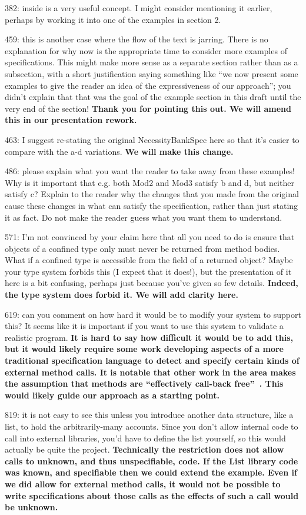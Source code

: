 \documentclass[11pt]{amsart}
\newcommand{\us}[1]{\bf #1}
\begin{document}
382: inside is a very useful concept. I might consider mentioning it earlier, perhaps by working it into one of the examples in section 2.

459: this is another case where the flow of the text is jarring. There is no explanation for why now is the appropriate time to consider more examples of specifications. This might make more sense as a separate section rather than as a subsection, with a short justification saying something like “we now present some examples to give the reader an idea of the expressiveness of our approach”; you didn’t explain that that was the goal of the example section in this draft until the very end of the section!
{\us{Thank you for pointing this out. We will amend this in our presentation rework.}}

463: I suggest re-stating the original NecessityBankSpec here so that it’s easier to compare with the a-d variations.
{\us{We will make this change.}}

486: please explain what you want the reader to take away from these examples! Why is it important that e.g. both Mod2 and Mod3 satisfy b and d, but neither satisfy c? Explain to the reader why the changes that you made from the original cause these changes in what can satisfy the specification, rather than just stating it as fact. Do not make the reader guess what you want them to understand.

571: I’m not convinced by your claim here that all you need to do is ensure that objects of a confined type only must never be returned from method bodies. What if a confined type is accessible from the field of a returned object? Maybe your type system forbids this (I expect that it does!), but the presentation of it here is a bit confusing, perhaps just because you’ve given so few details.
{\us{Indeed, the type system does forbid it. We will add clarity here.}}

619: can you comment on how hard it would be to modify your system to support this? It seems like it is important if you want to use this system to validate a realistic program.
{\us{It is hard to say how difficult it would be to add this, but it would likely require some work developing aspects of a more traditional specification language to detect 
and specify certain kinds of external method calls. It is notable that other work in the area makes the assumption that methods are ``effectively call-back free''~\citep{Permenev}. 
This would likely guide our approach as a starting point.}}

819: it is not easy to see this unless you introduce another data structure, like a list, to hold the arbitrarily-many accounts. Since you don’t allow internal code to call into external libraries, you’d have to define the list yourself, so this would actually be quite the project.
{\us{Technically the restriction does not allow calls to unknown, and thus unspecifiable, code. If the List library code was known, 
and specifiable then we could extend the example. Even if we did allow for external method calls, it would not be possible to write
specifications about those calls as the effects of such a call would be unknown.}}
\end{document}
